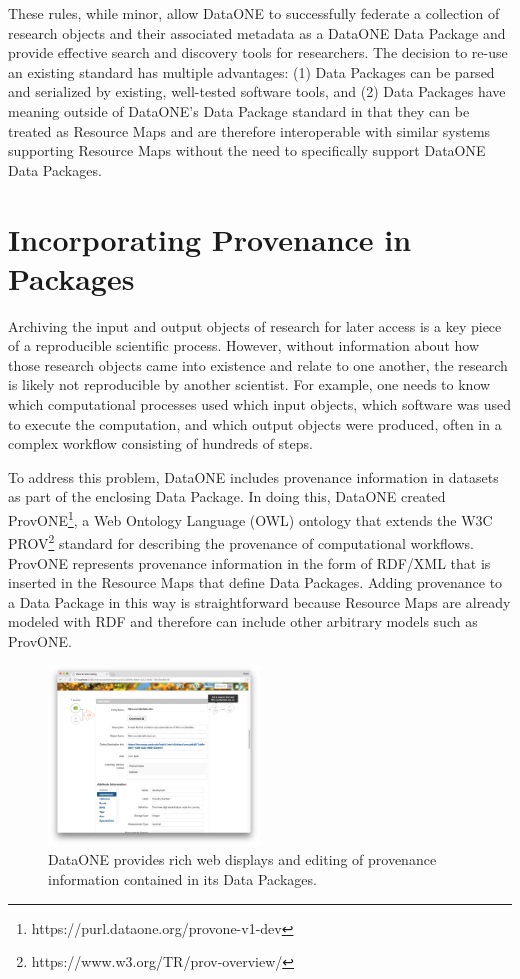 \documentclass[conference]{IEEEtran}
\begin{document}
These rules, while minor, allow DataONE to successfully federate a collection of research objects and their associated metadata as a DataONE Data Package and provide effective search and discovery tools for researchers.
The decision to re-use an existing standard has multiple advantages: (1) Data Packages can be parsed and serialized by existing, well-tested software tools, and (2) Data Packages have meaning outside of DataONE’s Data Package standard in that they can be treated as Resource Maps and are therefore interoperable with similar systems supporting Resource Maps without the need to specifically support DataONE Data Packages.

\section{Incorporating Provenance in Packages}

Archiving the input and output objects of research for later access is a key piece of a reproducible scientific process.
However, without information about how those research objects came into existence and relate to one another, the research is likely not reproducible by another scientist.
For example, one needs to know which computational processes used which input objects, which software was used to execute the computation, and which output objects were produced, often in a complex workflow consisting of hundreds of steps.

To address this problem, DataONE includes provenance information in datasets as part of the enclosing Data Package.
In doing this, DataONE created ProvONE\footnote{https://purl.dataone.org/provone-v1-dev}, a Web Ontology Language (OWL) ontology that extends the W3C PROV\footnote{https://www.w3.org/TR/prov-overview/} standard for describing the provenance of computational workflows.
ProvONE represents provenance information in the form of RDF/XML that is inserted in the Resource Maps that define Data Packages.
Adding provenance to a Data Package in this way is straightforward because Resource Maps are already modeled with RDF and therefore can include other arbitrary models such as ProvONE.

\begin{figure}[ht]
\centerline{\includegraphics[width=0.5\textwidth]{prov-editor.png}}
\caption{DataONE provides rich web displays and editing of provenance information contained in its Data Packages.}
\label{prov-editor}
\end{figure}
\end{document}
